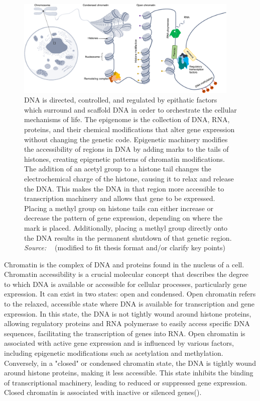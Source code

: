 \begin{figure}[!ht]
	\centering
	\includegraphics[width=0.95\textwidth]{chromatin_organization/fig}
	\vspace{0.1cm}
	\caption[DNA organization] {DNA is directed, controlled, and regulated by epithatic factors which surround and scaffold DNA in order to orchestrate the cellular mechanisms of life. The epigenome is the collection of DNA, RNA, proteins, and their chemical modifications that alter gene expression without changing the genetic code. Epigenetic machinery modifies the accessibility of regions in DNA by adding marks to the tails of histones, creating epigenetic patterns of chromatin modifications. The addition of an acetyl group to a histone tail changes the electrochemical charge of the histone, causing it to relax and release the DNA. This makes the DNA in that region more accessible to transcription machinery and allows that gene to be expressed. Placing a methyl group on histone tails can either increase or decrease the pattern of gene expression, depending on where the mark is placed. Additionally, placing a methyl group directly onto the DNA results in the permanent shutdown of that genetic region. \emph{Source: ~\citep{heumos2023best}} (modified to fit thesis format and/or clarify key points)}
	\label{fig:chromatin_organization}
\end{figure}


Chromatin is the complex of DNA and proteins found in the nucleus of a cell. Chromatin accessibility is a crucial molecular concept that describes the degree to which DNA is available or accessible for cellular processes, particularly gene expression. It can exist in two states: open and condensed. Open chromatin refers to the relaxed, accessible state where DNA is available for transcription and gene expression. In this state, the DNA is not tightly wound around histone proteins, allowing regulatory proteins and RNA polymerase to easily access specific DNA sequences, facilitating the transcription of genes into RNA. Open chromatin is associated with active gene expression and is influenced by various factors, including epigenetic modifications such as acetylation and methylation. Conversely, in a "closed" or condensed chromatin state, the DNA is tightly wound around histone proteins, making it less accessible. This state inhibits the binding of transcriptional machinery, leading to reduced or suppressed gene expression. Closed chromatin is associated with inactive or silenced genes().


